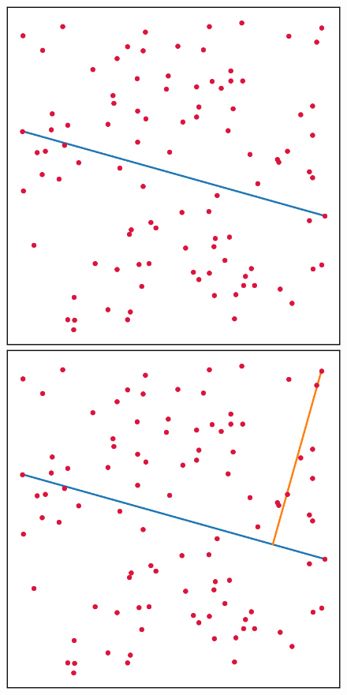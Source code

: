 \documentclass[]{finalproject}
\begin{document}
\begin{figure}[H]
    \centering
    \begin{minipage}{.25\linewidth}
		\includegraphics[width=\linewidth]{quickhull1.png}
	\end{minipage}
	\begin{minipage}{.25\linewidth}
		\includegraphics[width=\linewidth]{quickhull2.png}

\end{minipage}
\end{figure}
\end{document}
